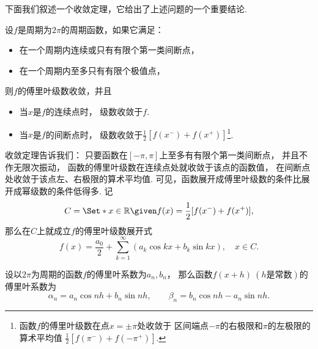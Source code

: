 下面我们叙述一个收敛定理，它给出了上述问题的一个重要结论.
\begin{theorem}\label{theorem:无穷级数.傅里叶级数收敛的狄利克雷充分条件}
设\(f\)是周期为\(2 \pi\)的周期函数，如果它满足：\begin{itemize}
	\item 在一个周期内连续或只有有限个第一类间断点，
	\item 在一个周期内至多只有有限个极值点，
\end{itemize}
则\(f\)的傅里叶级数收敛，并且\begin{itemize}
	\item 当\(x\)是\(f\)的连续点时，
	级数收敛于\(f\).

	\item 当\(x\)是\(f\)的间断点时，
	级数收敛于\(\frac{1}{2} [ f(x^-) + f(x^+) ]\)\footnote{%
	函数\(f\)的傅里叶级数在点\(x=\pm\pi\)处收敛于%
	区间端点\(-\pi\)的右极限和\(\pi\)的左极限的算术平均值%
	\(\frac{1}{2} [ f(\pi^-) + f(-\pi^+) ]\).}.
\end{itemize}
\end{theorem}

收敛定理告诉我们：
只要函数在\([-\pi,\pi]\)上至多有有限个第一类间断点，
并且不作无限次振动，
函数的傅里叶级数在连续点处就收敛于该点的函数值，
在间断点处收敛于该点左、右极限的算术平均值.
可见，函数展开成傅里叶级数的条件比展开成幂级数的条件低得多.
记
\begin{equation}
	C = \Set*{
		x \in \mathbb{R}
		\given
		f(x) = \frac{1}{2} [ f(x^-) + f(x^+) ]
	},
\end{equation}
那么在\(C\)上就成立\(f\)的傅里叶级数展开式\begin{equation*}
	f(x) = \frac{a_0}{2} + \sum_{k=1}^\infty (a_k \cos{kx} + b_k \sin kx),
	\quad x \in C.
\end{equation*}

\begin{theorem}
设以\(2\pi\)为周期的函数\(f\)的傅里叶系数为\(a_n,b_n\)，
那么函数\(f(x+h)\ (h\text{是常数})\)的傅里叶系数为\begin{equation*}
	\alpha_n
	= a_n \cos nh + b_n \sin nh,
	\qquad
	\beta_n
	= b_n \cos nh - a_n \sin nh.
\end{equation*}
\end{theorem}

